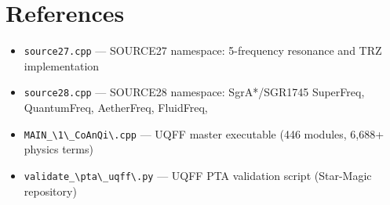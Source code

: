 \documentclass[12pt,a4paper]{article}
\begin{document}
\section*{References}
\begin{itemize}
  \item[8.] \texttt{source27.cpp} --- SOURCE27 namespace: 5-frequency resonance and TRZ implementation
  \item[9.] \texttt{source28.cpp} --- SOURCE28 namespace: SgrA*/SGR1745 SuperFreq, QuantumFreq, AetherFreq, FluidFreq,
  \item[10.] \texttt{MAIN\_\textbackslash {1\textbackslash \_CoAnQi\textbackslash }.cpp} --- UQFF master executable (446 modules, 6,688+ physics terms)
  \item[11.] \texttt{validate\_\textbackslash {pta\textbackslash \_uqff\textbackslash }.py} --- UQFF PTA validation script (Star-Magic repository)
\end{itemize}

\end{document}
